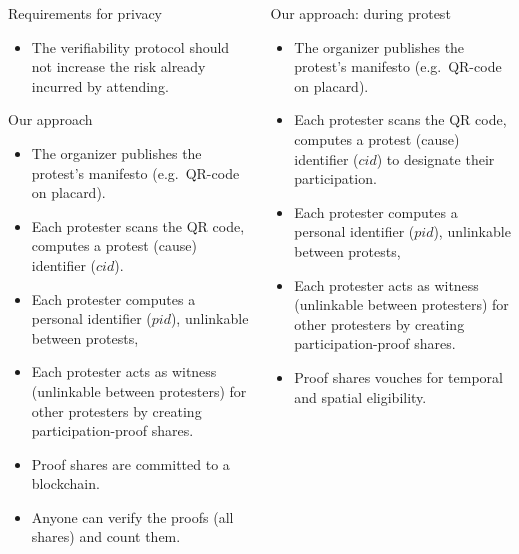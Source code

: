 \begin{columns}[t]
\begin{column}{0.32\linewidth}
    \begin{blueblock}{Requirements for privacy}
      \begin{itemize}
        \item The verifiability protocol should not increase the risk already 
          incurred by attending.
      \end{itemize}
    \end{blueblock}

    \begin{greenblock}{Our approach}
      \begin{itemize}
        \item The organizer publishes the protest's manifesto (e.g.\ QR-code on 
          placard).
        \item Each protester scans the QR code, computes a protest (cause) 
          identifier (\(cid\)).
        \item Each protester computes a personal identifier (\(pid\)), 
          unlinkable between protests,
        \item Each protester acts as witness (unlinkable between protesters) for 
          other protesters by creating participation-proof shares.
        \item Proof shares are committed to a blockchain.
        \item Anyone can verify the proofs (all shares) and count them.
      \end{itemize}
    \end{greenblock}

  \end{column}

  \hfill

  \begin{column}{0.32\linewidth}

    \begin{greenblock}{Our approach: during protest}
      \begin{itemize}
        \item The organizer publishes the protest's manifesto (e.g.\ QR-code on 
          placard).
        \item Each protester scans the QR code, computes a protest (cause) 
          identifier (\(cid\)) to designate their participation.
        \item Each protester computes a personal identifier (\(pid\)), 
          unlinkable between protests,
        \item Each protester acts as witness (unlinkable between protesters) for 
          other protesters by creating participation-proof shares.
        \item Proof shares vouches for temporal and spatial eligibility.
      \end{itemize}
    \end{greenblock}


\end{column}
\end{columns}
